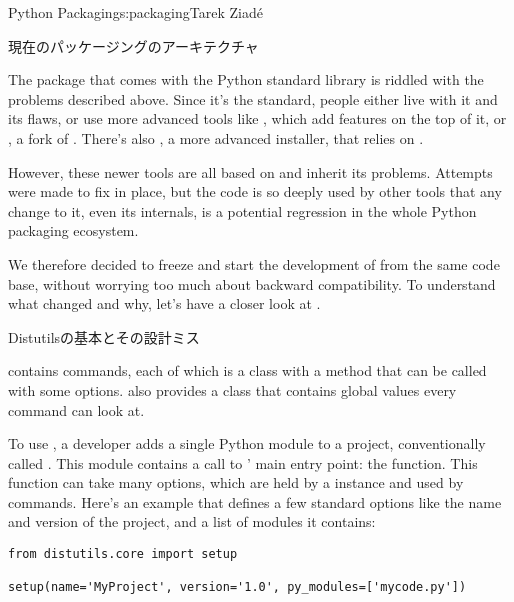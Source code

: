 \begin{aosachapter}{Python Packaging}{s:packaging}{Tarek Ziad\'{e}}
\begin{aosasect1}{現在のパッケージングのアーキテクチャ}

The  package that comes with the Python standard
library is riddled with the problems described above.  Since it's the
standard, people either live with it and its flaws, or use more
advanced tools like , which add features on the top of it,
or , a fork of . There's also ,
a more advanced installer, that relies on .

However, these newer tools are all based on  and inherit its
problems.  Attempts were made to fix  in place, but
the code is so deeply used by other tools that any change to it, even
its internals, is a potential regression in the whole Python packaging
ecosystem.

We therefore decided to freeze  and start the
development of  from the same code base, without
worrying too much about backward compatibility.  To understand what
changed and why, let's have a closer look at .

\begin{aosasect2}{Distutilsの基本とその設計ミス}
\label{sec.packaging.flaws}

 contains commands, each of which is a class with a
 method that can be called with some options.  
also provides a  class that contains global values
every command can look at.

To use , a developer adds a single Python module to a
project, conventionally called . This module contains a
call to ' main entry point: the  function.  This
function can take many options, which are held by a
 instance and used by commands.  Here's an example
that defines a few standard options like the name and version of the
project, and a list of modules it contains:

\pagebreak

\begin{verbatim}
from distutils.core import setup

setup(name='MyProject', version='1.0', py_modules=['mycode.py'])
\end{verbatim}


\end{aosasect2}
\end{aosasect1}
\end{aosachapter}

